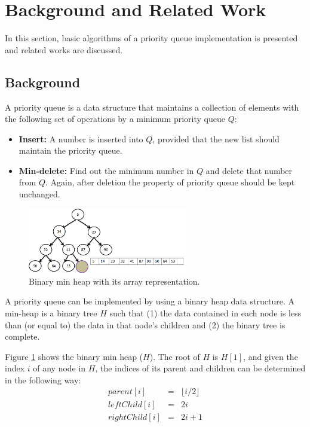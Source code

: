\documentclass[10pt, conference, compsocconf]{IEEEtran}
\newtheorem{definition}{Definition}[section]
\begin{document}
\section{Background and Related Work}
In this section, basic algorithms of a priority queue implementation is presented and related works are discussed.

\subsection{Background}
A priority queue is a data structure that maintains a collection of elements with the following set of
operations by a minimum priority queue $Q$:
\begin{itemize}
\item {\bf Insert: } A number is inserted into $Q$, provided that the new list should maintain the priority queue.

\item {\bf Min-delete:} Find out the minimum number in $Q$ and delete that number from $Q$. Again, after deletion the property of priority queue should be kept unchanged.
\end{itemize}


\begin{figure}[!ht]
  \centering
  \includegraphics[width=7cm]{Figures/fig2.png}
      \caption{Binary min heap with its array representation.}
    \label{fig2}
\end{figure}

A priority queue can be implemented by using a binary heap data structure.
A min-heap is a binary tree $H$ such that (1) the data contained in each node is less than (or equal to) the data in that node’s children and (2) the binary tree is complete.

Figure \ref{fig2} shows the binary min heap ($H$). The root of $H$ is $H[1]$, and given the index $i$ of any node in $H$, the indices of its parent and children can be determined in the following way:
\begin{eqnarray*}
parent[i] &=&  \lfloor i/2 \rfloor \\
leftChild[i] &=& 2i\\
rightChild[i] &=& 2i + 1
\end{eqnarray*}
\end{document}
